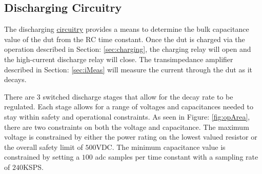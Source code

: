 \subsection{Discharging Circuitry}

The discharging \hyperlink{sch:discharging}{circuitry} provides a means to determine the bulk capacitance value of the \gls{dut} from the RC time constant. Once the \gls{dut} is charged via the operation described in Section: \ref{sec:charging}, the charging relay will open and the high-current discharge relay will close. The transimpedance amplifier described in Section: \ref{sec:iMeas} will measure the current through the \gls{dut} as it decays.

There are 3 switched discharge stages that allow for the decay rate to be regulated. Each stage allows for a range of voltages and capacitances needed to stay within safety and operational constraints. As seen in Figure: \ref{fig:opArea}, there are two constraints on both the voltage and capacitance. The maximum voltage is constrained by either the power rating on the lowest valued resistor or the overall safety limit of $500$VDC. The minimum capacitance value is constrained by setting a $100$ \gls{adc} samples per time constant with a sampling rate of $240$KSPS.



